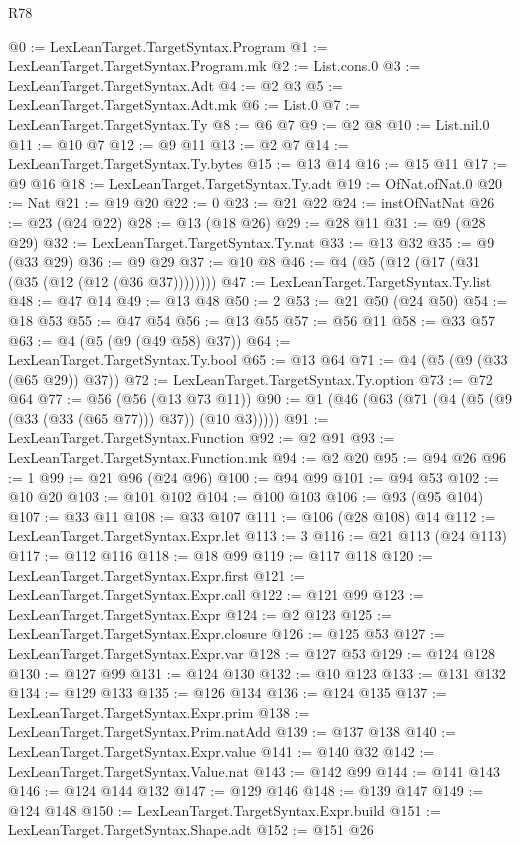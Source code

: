 \begin{lexlean}{R78}
\begin{coremodule}
@0 := LexLeanTarget.TargetSyntax.Program
@1 := LexLeanTarget.TargetSyntax.Program.mk
@2 := List.cons.{0}
@3 := LexLeanTarget.TargetSyntax.Adt
@4 := @2 @3
@5 := LexLeanTarget.TargetSyntax.Adt.mk
@6 := List.{0}
@7 := LexLeanTarget.TargetSyntax.Ty
@8 := @6 @7
@9 := @2 @8
@10 := List.nil.{0}
@11 := @10 @7
@12 := @9 @11
@13 := @2 @7
@14 := LexLeanTarget.TargetSyntax.Ty.bytes
@15 := @13 @14
@16 := @15 @11
@17 := @9 @16
@18 := LexLeanTarget.TargetSyntax.Ty.adt
@19 := OfNat.ofNat.{0}
@20 := Nat
@21 := @19 @20
@22 := 0
@23 := @21 @22
@24 := instOfNatNat
@26 := @23 (@24 @22)
@28 := @13 (@18 @26)
@29 := @28 @11
@31 := @9 (@28 @29)
@32 := LexLeanTarget.TargetSyntax.Ty.nat
@33 := @13 @32
@35 := @9 (@33 @29)
@36 := @9 @29
@37 := @10 @8
@46 := @4 (@5 (@12 (@17 (@31 (@35 (@12 (@12 (@36 @37))))))))
@47 := LexLeanTarget.TargetSyntax.Ty.list
@48 := @47 @14
@49 := @13 @48
@50 := 2
@53 := @21 @50 (@24 @50)
@54 := @18 @53
@55 := @47 @54
@56 := @13 @55
@57 := @56 @11
@58 := @33 @57
@63 := @4 (@5 (@9 (@49 @58) @37))
@64 := LexLeanTarget.TargetSyntax.Ty.bool
@65 := @13 @64
@71 := @4 (@5 (@9 (@33 (@65 @29)) @37))
@72 := LexLeanTarget.TargetSyntax.Ty.option
@73 := @72 @64
@77 := @56 (@56 (@13 @73 @11))
@90 := @1 (@46 (@63 (@71 (@4 (@5 (@9 (@33 (@33 (@65 @77))) @37)) (@10 @3)))))
@91 := LexLeanTarget.TargetSyntax.Function
@92 := @2 @91
@93 := LexLeanTarget.TargetSyntax.Function.mk
@94 := @2 @20
@95 := @94 @26
@96 := 1
@99 := @21 @96 (@24 @96)
@100 := @94 @99
@101 := @94 @53
@102 := @10 @20
@103 := @101 @102
@104 := @100 @103
@106 := @93 (@95 @104)
@107 := @33 @11
@108 := @33 @107
@111 := @106 (@28 @108) @14
@112 := LexLeanTarget.TargetSyntax.Expr.let
@113 := 3
@116 := @21 @113 (@24 @113)
@117 := @112 @116
@118 := @18 @99
@119 := @117 @118
@120 := LexLeanTarget.TargetSyntax.Expr.first
@121 := LexLeanTarget.TargetSyntax.Expr.call
@122 := @121 @99
@123 := LexLeanTarget.TargetSyntax.Expr
@124 := @2 @123
@125 := LexLeanTarget.TargetSyntax.Expr.closure
@126 := @125 @53
@127 := LexLeanTarget.TargetSyntax.Expr.var
@128 := @127 @53
@129 := @124 @128
@130 := @127 @99
@131 := @124 @130
@132 := @10 @123
@133 := @131 @132
@134 := @129 @133
@135 := @126 @134
@136 := @124 @135
@137 := LexLeanTarget.TargetSyntax.Expr.prim
@138 := LexLeanTarget.TargetSyntax.Prim.natAdd
@139 := @137 @138
@140 := LexLeanTarget.TargetSyntax.Expr.value
@141 := @140 @32
@142 := LexLeanTarget.TargetSyntax.Value.nat
@143 := @142 @99
@144 := @141 @143
@146 := @124 @144 @132
@147 := @129 @146
@148 := @139 @147
@149 := @124 @148
@150 := LexLeanTarget.TargetSyntax.Expr.build
@151 := LexLeanTarget.TargetSyntax.Shape.adt
@152 := @151 @26

\end{coremodule}
\end{lexlean}
